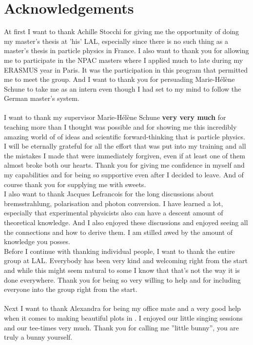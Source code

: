 \chapter*{Acknowledgements}
At first I want to thank Achille Stocchi for giving me the opportunity of doing my master's thesis at 'his' LAL, especially since there is no such thing as a master's thesis in particle physics in France. I also want to thank you for allowing me to participate in the NPAC masters where I applied much to late during my ERASMUS year in Paris. It was the participation in this program that permitted me to meet the \lhcb group. And I want to thank you for persuading Marie-H\'{e}l\`{e}ne Schune to take me as an intern even though I had set to my mind to follow the German master's system.\\
\\
I want to thank my supervisor Marie-H\'{e}l\`{e}ne Schune \textbf{very very much} for teaching more than I thought was possible and for showing me this incredibly amazing world of of ideas and scientific forward-thinking that is particle physics. I will be eternally grateful for all the effort that was put into my training and all the mistakes I made that were immediately forgiven, even if at least one of them almost broke both our hearts. Thank you for giving me confidence in myself and my capabilities and for being so supportive even after I decided to leave. And of course thank you for supplying me with sweets.\\
I also want to thank Jacques Lefrancois for the long discussions about bremsstrahlung, polarisation and photon conversion. I have learned a lot, especially that experimental physicists also can have a descent amount of theoretical knowledge. And I also enjoyed these discussions and enjoyed seeing all the connections and how to derive them. I am stilled awed by the amount of knowledge you posses.\\
Before I continue with thanking individual people, I want to thank the entire \lhcb group at LAL. Everybody has been very kind and welcoming right from the start and while this might seem natural to some I know that that's not the way it is done everywhere. Thank you for being so very willing to help and for including everyone into the group right from the start.\\
\\
Next I want to thank Alexandra for being my office mate and a very good help when it comes to making beautiful plots in \roofit. I enjoyed our little singing sessions and our tee-times very much. Thank you for calling me ''little bunny'', you are truly a bunny yourself.
